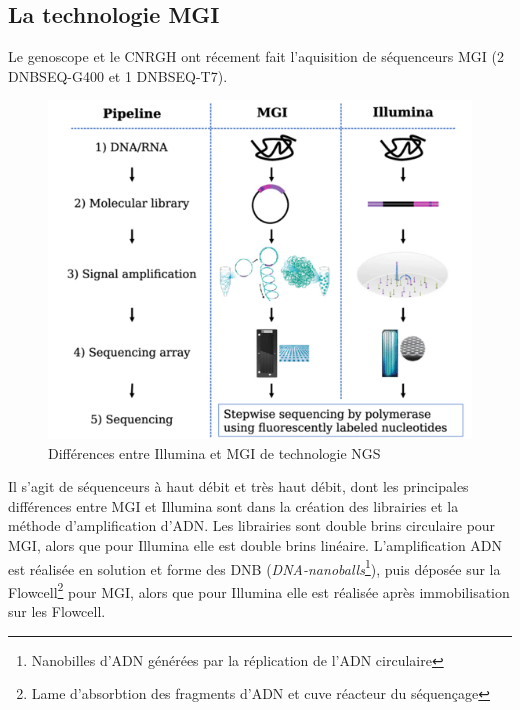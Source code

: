 \subsection{La technologie MGI}
Le genoscope et le CNRGH ont récement fait l'aquisition de séquenceurs MGI (2 DNBSEQ-G400 et 1 DNBSEQ-T7).


\begin{minipage}{0.45\textwidth}
	\begin{figure}[H]
        \centering
        \includegraphics[width=1\textwidth]{img/MGI_vs_Illumina.png}
        \caption{\footnotesize{Différences entre Illumina et MGI de technologie NGS}}
        \label{fig-Illu-vs-MGI}
    \end{figure}
\end{minipage} 
\hfill
\begin{minipage}{0.45\textwidth}
    Il s'agit de séquenceurs à haut débit et très haut débit, dont les principales différences entre MGI et Illumina sont dans la création des librairies et la méthode d'amplification d'ADN. Les librairies sont double brins circulaire pour MGI, alors que pour Illumina elle est double brins linéaire. L'amplification ADN est réalisée en solution et forme des DNB (\emph{DNA-nanoballs}\footnote{Nanobilles d'ADN générées par la réplication de l'ADN circulaire}), puis déposée sur la Flowcell\footnote{Lame d'absorbtion des fragments d'ADN et cuve réacteur du séquençage} pour MGI, alors que pour Illumina elle est réalisée après immobilisation sur les Flowcell.
\end{minipage}

